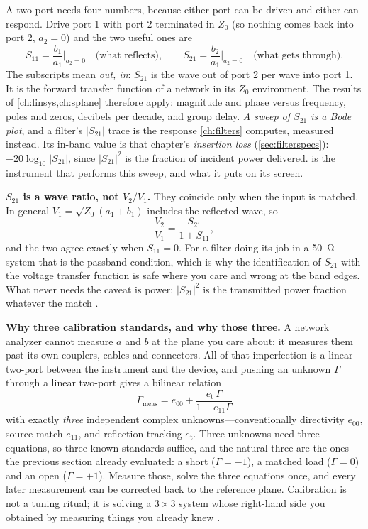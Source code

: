 A two-port needs four numbers, because either port can be driven and either can
respond. Drive port 1 with port 2 terminated in \(Z_0\) (so nothing comes back into
port 2, \(a_2=0\)) and the two useful ones are
\[
S_{11}=\frac{b_1}{a_1}\bigg|_{a_2=0}
\quad\text{(what reflects)},
\qquad
S_{21}=\frac{b_2}{a_1}\bigg|_{a_2=0}
\quad\text{(what gets through)} .
\]
The subscripts mean \emph{out, in}: \(S_{21}\) is the wave out of port 2 per wave
into port 1. It is the forward transfer function of a network in its \(Z_0\)
environment. The results of \cref{ch:linsys,ch:splane} therefore apply: magnitude
and phase versus frequency, poles and zeros, decibels per decade, and group delay.
\emph{A sweep of \(S_{21}\) is a Bode plot}, and a filter's
\(|S_{21}|\) trace is the response \cref{ch:filters} computes, measured instead. Its
in-band value is that chapter's \emph{insertion loss}
(\cref{sec:filterspecs}): \(-20\log_{10}|S_{21}|\), since \(|S_{21}|^2\) is the
fraction of incident power delivered.  is the instrument that performs
this sweep, and what it puts on its screen.

\begin{mistakebox}
\textbf{\(S_{21}\) is a wave ratio, not \(V_2/V_1\).} They coincide only when the
input is matched. In general \(V_1=\sqrt{Z_0}(a_1+b_1)\) includes the reflected wave,
so
\[
\frac{V_2}{V_1}=\frac{S_{21}}{1+S_{11}} ,
\]
and the two agree exactly when \(S_{11}=0\). For a filter doing its job in a
\SI{50}{\ohm} system that is the passband condition, which is why the identification
of \(S_{21}\) with the voltage transfer function is safe where you care and wrong at
the band edges. What never needs the caveat is power: \(|S_{21}|^2\) is the
transmitted power fraction whatever the match
\cite[pp.~91--100]{davis2011rfcircuit}.
\end{mistakebox}

\begin{advancedbox}
\textbf{Why three calibration standards, and why those three.} A network analyzer
cannot measure \(a\) and \(b\) at the plane you care about; it measures them past its
own couplers, cables and connectors. All of that imperfection is a linear two-port
between the instrument and the device, and pushing an unknown \(\Gamma\) through a
linear two-port gives a bilinear relation
\[
\Gamma_{\text{meas}}=e_{00}+\frac{e_{\text{t}}\,\Gamma}{1-e_{11}\Gamma}
\]
with exactly \emph{three} independent complex unknowns---conventionally directivity
\(e_{00}\), source match \(e_{11}\), and reflection tracking \(e_{\text{t}}\). Three
unknowns need three equations, so three known standards suffice, and the natural three
are the ones the previous section already evaluated: a short (\(\Gamma=-1\)), a
matched load (\(\Gamma=0\)) and an open (\(\Gamma=+1\)). Measure those, solve the
three equations once, and every later measurement can be corrected back to the
reference plane. Calibration is not a tuning ritual; it is solving a \(3\times3\)
system whose right-hand side you obtained by measuring things you already knew
\cite[pp.~196--205]{free2022rfmicrowave}.
\end{advancedbox}

